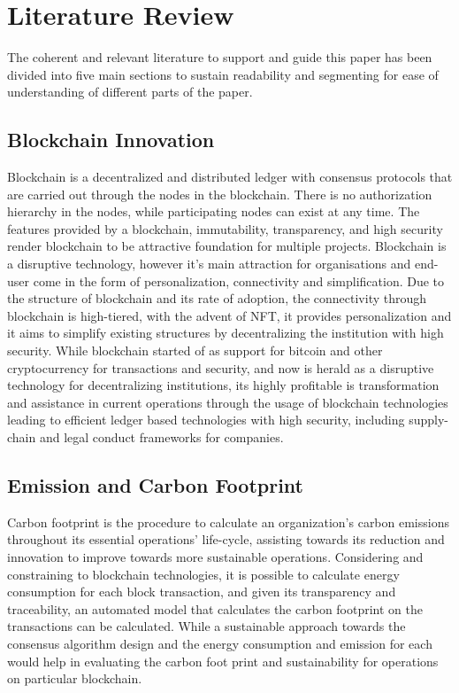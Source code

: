 \documentclass[11pt, a4paper]{article}
\begin{document}
\newpage

\section*{Literature Review}
The coherent and relevant literature to support and guide this paper has been divided into five main sections to sustain readability and segmenting for ease of understanding of different parts of the paper.

\subsection*{Blockchain Innovation}

Blockchain is a decentralized and distributed ledger with consensus protocols that are carried out through the nodes in the blockchain.\cite{strack_blockchain_2022} There is no authorization hierarchy in the nodes, while participating nodes can exist at any time. The features provided by a blockchain, immutability, transparency, and high security render blockchain to be attractive foundation for multiple projects. Blockchain is a disruptive technology, however it's main attraction for organisations and end-user come in the form of personalization, connectivity and simplification. Due to the structure of blockchain and its rate of adoption, the connectivity through blockchain is high-tiered, with the advent of NFT, it provides personalization and it aims to simplify existing structures by decentralizing the institution with high security. \cite{yan_insurtech_2018} 
While blockchain started of as support for bitcoin and other cryptocurrency for transactions and security, and now is herald as a disruptive technology for decentralizing institutions, its highly profitable is transformation and assistance in current operations through the usage of blockchain technologies leading to efficient ledger based technologies with high security, including supply-chain and legal conduct frameworks for companies.\cite{kouhizadeh_blockchain_2021}

\subsection*{Emission and Carbon Footprint}

Carbon footprint is the procedure to calculate an organization's carbon emissions throughout its essential operations' life-cycle, assisting towards its reduction and innovation to improve towards more sustainable operations. Considering and constraining to blockchain technologies, it is possible to calculate energy consumption for each block transaction, and given its transparency and traceability, an automated model that calculates the carbon footprint on the transactions can be calculated. \cite{platt_energy_2021} While a sustainable approach towards the consensus algorithm design and the energy consumption and emission for each would help in evaluating the carbon foot print and sustainability for operations on particular blockchain.\cite{green_block} 
\end{document}
